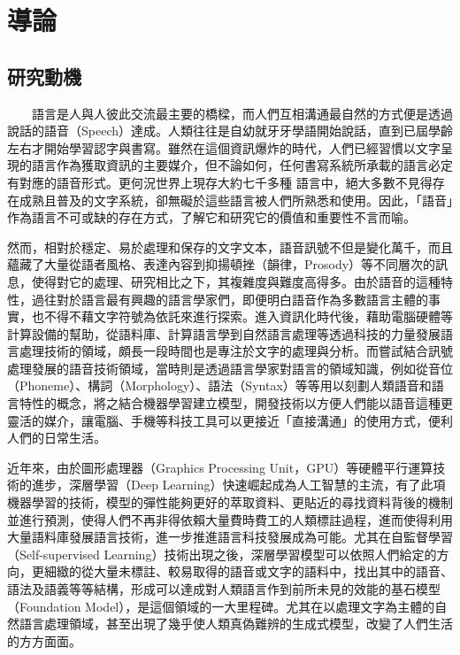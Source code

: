 \chapter{導論}

\section{研究動機}

　　語言是人與人彼此交流最主要的橋樑，而人們互相溝通最自然的方式便是透過說話的語音（Speech）達成。人類往往是自幼就牙牙學語開始說話，直到已屆學齡左右才開始學習認字與書寫。雖然在這個資訊爆炸的時代，人們已經習慣以文字呈現的語言作為獲取資訊的主要媒介，但不論如何，任何書寫系統所承載的語言必定有對應的語音形式。更何況世界上現存大約七千多種 \cite{eberhard_ethnologue_2024} 語言中，絕大多數不見得存在成熟且普及的文字系統，卻無礙於這些語言被人們所熟悉和使用。因此，「語音」作為語言不可或缺的存在方式，了解它和研究它的價值和重要性不言而喻。

        然而，相對於穩定、易於處理和保存的文字文本，語音訊號不但是變化萬千，而且蘊藏了大量從語者風格、表達內容到抑揚頓挫（韻律，Prosody）等不同層次的訊息，使得對它的處理、研究相比之下，其複雜度與難度高得多。由於語音的這種特性，過往對於語言最有興趣的語言學家們，即便明白語音作為多數語言主體的事實，也不得不藉文字符號為依託來進行探索。進入資訊化時代後，藉助電腦硬體等計算設備的幫助，從語料庫、計算語言學到自然語言處理等透過科技的力量發展語言處理技術的領域，頗長一段時間也是專注於文字的處理與分析。而嘗試結合訊號處理發展的語音技術領域，當時則是透過語言學家對語言的領域知識，例如從音位（Phoneme）、構詞（Morphology）、語法（Syntax）等等用以刻劃人類語音和語言特性的概念，將之結合機器學習建立模型，開發技術以方便人們能以語音這種更靈活的媒介，讓電腦、手機等科技工具可以更接近「直接溝通」的使用方式，便利人們的日常生活。

        近年來，由於圖形處理器（Graphics Processing Unit，GPU）等硬體平行運算技術的進步，深層學習（Deep Learning）快速崛起成為人工智慧的主流，有了此項機器學習的技術，模型的彈性能夠更好的萃取資料、更貼近的尋找資料背後的機制並進行預測，使得人們不再非得依賴大量費時費工的人類標註過程，進而使得利用大量語料庫發展語言技術，進一步推進語言科技發展成為可能。尤其在自監督學習（Self-supervised Learning）技術出現之後，深層學習模型可以依照人們給定的方向，更細緻的從大量未標註、較易取得的語音或文字的語料中，找出其中的語音、語法及語義等等結構，形成可以達成對人類語言作到前所未見的效能的基石模型（Foundation Model），是這個領域的一大里程碑。尤其在以處理文字為主體的自然語言處理領域，甚至出現了幾乎使人類真偽難辨的生成式模型，改變了人們生活的方方面面。

